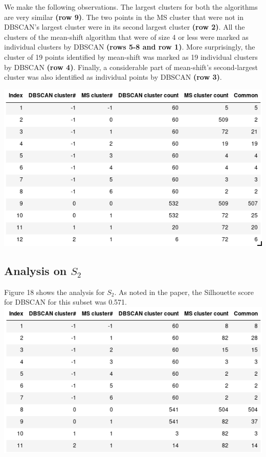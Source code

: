 \documentclass[12pt,a4paper]{article}
\begin{document}
We make the following observations. The largest clusters for both the algorithms are very similar \textbf{(row 9)}. The two points in the MS cluster that were not in DBSCAN's largest cluster were in its second largest cluster \textbf{(row 2)}. All the clusters of the mean-shift algorithm that were of size 4 or less were marked as individual clusters by DBSCAN \textbf{(rows 5-8 and row 1)}. More surprisingly, the cluster of 19 points identified by mean-shift was marked as 19 individual clusters by DBSCAN \textbf{(row 4)}. Finally, a considerable part of mean-shift's second-largest cluster was also identified as individual points by DBSCAN \textbf{(row 3)}.

\includegraphics[scale=0.65]{cluster_s1.png}
\begingroup
{}
\endgroup

\subsection{Analysis on $S_2$}
Figure 18 shows the analysis for $S_2$. As noted in the paper, the Silhouette score for DBSCAN for this subset was 0.571. \\

\includegraphics[scale=0.65]{clustering.png}
\begingroup
{}
\endgroup
\end{document}
